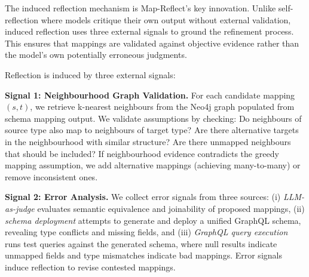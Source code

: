 \documentclass[sigconf, nonacm]{acmart}
\newcommand{\deleted}[1]{\textcolor{red}{#1}}
\begin{document}

The induced reflection mechanism is Map-Reflect's key innovation. Unlike self-reflection where models critique their own output without external validation, induced reflection uses three external signals to ground the refinement process. This ensures that mappings are validated against objective evidence rather than the model's own potentially erroneous judgments.


Reflection is induced by three external signals:

\textbf{Signal 1: Neighbourhood Graph Validation.} For each candidate mapping $(s, t)$, we retrieve k-nearest neighbours from the Neo4j graph populated from schema mapping output. We validate assumptions by checking: Do neighbours of source type also map to neighbours of target type? Are there alternative targets in the neighbourhood with similar structure? Are there unmapped neighbours that should be included? If neighbourhood evidence contradicts the greedy mapping assumption, we add alternative mappings (achieving many-to-many) or remove inconsistent ones.

\textbf{Signal 2: Error Analysis.} We collect error signals from three sources: (i) \emph{LLM-as-judge} evaluates semantic equivalence and joinability of proposed mappings, (ii) \emph{schema deployment} attempts to generate and deploy a unified GraphQL schema, revealing type conflicts and missing fields, and (iii) \emph{GraphQL query execution} runs test queries against the generated schema, where null results indicate unmapped fields and type mismatches indicate bad mappings. Error signals induce reflection to revise contested mappings.
\end{document}
